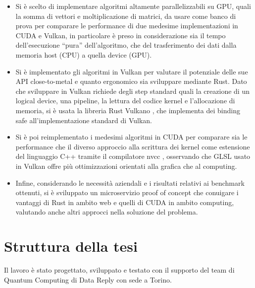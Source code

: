\begin{itemize}
    \item Si è scelto di implementare algoritmi altamente parallelizzabili su GPU, quali la somma di vettori e moltiplicazione di matrici, da usare come banco di prova per comparare le performance di due medesime implementazioni in CUDA e Vulkan, in particolare è preso in considerazione sia il tempo dell'esecuzione ``pura'' dell'algoritmo, che del trasferimento dei dati dalla memoria host (CPU) a quella device (GPU).
    \item Si è implementato gli algoritmi in Vulkan per valutare il potenziale delle sue API close-to-metal e quanto ergonomico sia sviluppare mediante Rust. Dato che sviluppare in Vulkan richiede degli step standard quali la creazione di un logical device, una pipeline, la lettura del codice kernel e l'allocazione di memoria, si è usata la libreria Rust Vulkano \cite[]{github:Vulkano}, che implementa dei binding safe all'implementazione standard di Vulkan.
    \item Si è poi reimplementato i medesimi algoritmi in CUDA per comparare sia le performance che il diverso approccio alla scrittura dei kernel come estensione del linguaggio C++ tramite il compilatore nvcc \cite[]{Nvidia:nvcc}, osservando che GLSL \cite[]{KG:GLSL} usato in Vulkan offre più ottimizzazioni orientati alla grafica che al computing.
    \item Infine, considerando le necessità aziendali e i risultati relativi ai benchmark ottenuti, si è sviluppato un microservizio proof of concept che conuigare i vantaggi di Rust in ambito web e quelli di CUDA in ambito computing, valutando anche altri approcci nella soluzione del problema.
\end{itemize}



\section[Struttura della tesi]{Struttura della tesi}



Il lavoro è stato progettato, sviluppato e testato con il supporto del team di Quantum Computing di Data Reply con sede a Torino. 

